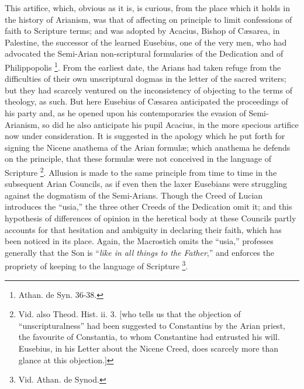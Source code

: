 This artifice, which, obvious as it is, is curious, from the place
which it holds in the history of Arianism, was that of affecting on
principle to limit confessions of faith to Scripture terms; and was
adopted by Acacius, Bishop of Cæsarea, in Palestine, the successor of
the learned Eusebius, one of the very men, who had advocated the
Semi-Arian non-scriptural formularies of the Dedication and of
Philippopolis \footnote{Athan. de Syn. 36-38.}. From
the earliest date, the Arians had taken refuge from the difficulties
of their own unscriptural dogmas in the letter of the sacred writers;
but they had scarcely ventured on the inconsistency of objecting to
the terms of theology, as such. But here Eusebius of Cæsarea
anticipated the proceedings of his party and, as he opened upon his
contemporaries the evasion of Semi-Arianism, so did he also anticipate
his pupil Acacius, in the more specious artifice now under
consideration. It is suggested in the apology which he put forth for
signing the Nicene anathema of the Arian formulæ; which anathema he
defends on the principle, that these formulæ were not conceived in the language of Scripture \footnote{Vid. also Theod. Hist. ii. 3. [who tells
us that the objection of ``unscripturalness'' had been
suggested to Constantius by the Arian priest, the favourite of
Constantia, to whom Constantine had entrusted his will. Eusebius, in
his Letter about the Nicene Creed, does scarcely more than glance at
this objection.]}. Allusion is made to the same principle from time to time in
the subsequent Arian Councils, as if even then the laxer Eusebians
were struggling against the dogmatism of the Semi-Arians. Though the
Creed of Lucian introduces the ``usia,'' the three other
Creeds of the Dedication omit it; and this hypothesis of differences
of opinion in the heretical body at these Councils partly accounts for
that hesitation and ambiguity in declaring their faith, which has been
noticed in its place. Again, the Macrostich omits the ``usia,''
professes generally that the Son is ``\emph{like in all things to the
Father},'' and enforces the propriety of keeping to the
language of Scripture \footnote{Vid. Athan. de Synod.}.

